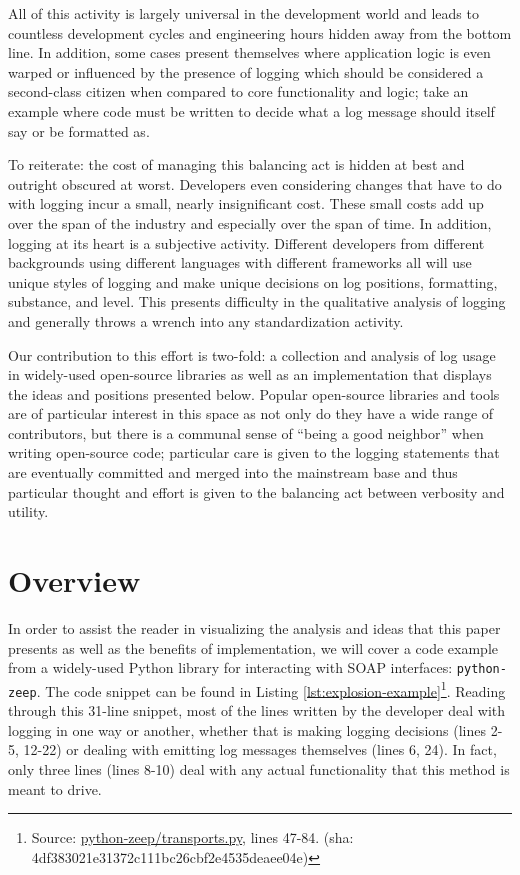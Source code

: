 \documentclass[acmsmall,review,authorversion]{acmart}
\newcommand{\code}[1]{\lstinline[basicstyle=\ttfamily\small]~#1~}
\begin{document}
    All of this activity is largely universal in the development world and leads to countless development cycles and engineering hours hidden away from the bottom line. In addition, some cases present themselves where application logic is even warped or influenced by the presence of logging which should be considered a second-class citizen when compared to core functionality and logic; take an example where code must be written to decide what a log message should itself say or be formatted as.

    To reiterate: the cost of managing this balancing act is hidden at best and outright obscured at worst. Developers even considering changes that have to do with logging incur a small, nearly insignificant cost. These small costs add up over the span of the industry and especially over the span of time. In addition, logging at its heart is a subjective activity. Different developers from different backgrounds using different languages with different frameworks all will use unique styles of logging and make unique decisions on log positions, formatting, substance, and level. This presents difficulty in the qualitative analysis of logging and generally throws a wrench into any standardization activity.

    Our contribution to this effort is two-fold: a collection and analysis of log usage in widely-used open-source libraries as well as an implementation that displays the ideas and positions presented below. Popular open-source libraries and tools are of particular interest in this space as not only do they have a wide range of contributors, but there is a communal sense of ``being a good neighbor'' when writing open-source code; particular care is given to the logging statements that are eventually committed and merged into the mainstream base and thus particular thought and effort is given to the balancing act between verbosity and utility.

\section{Overview}

    In order to assist the reader in visualizing the analysis and ideas that this paper presents as well as the benefits of implementation, we will cover a code example from a widely-used Python library for interacting with SOAP interfaces: \code{python-zeep}. The code snippet can be found in Listing \ref{lst:explosion-example}\footnote{Source: \href{https://github.com/mvantellingen/python-zeep/blob/4df383021e31372c111bc26cbf2e4535deaee04e/src/zeep/transports.py\#L47}{python-zeep/transports.py}, lines 47-84. (sha: 4df383021e31372c111bc26cbf2e4535deaee04e)}. Reading through this 31-line snippet, most of the lines written by the developer deal with logging in one way or another, whether that is making logging decisions (lines 2-5, 12-22) or dealing with emitting log messages themselves (lines 6, 24). In fact, only three lines (lines 8-10) deal with any actual functionality that this method is meant to drive.
\end{document}
